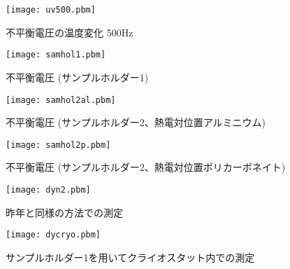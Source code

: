 \begin{figure}[htb]
	\begin{center}
	\texttt{[image: uv500.pbm]}
	\end{center}
	\caption{不平衡電圧の温度変化 500Hz}
	\label{fig:U.Voltage 500Hz}
\end{figure}

\begin{figure}[htb]
	\begin{center}
	\texttt{[image: samhol1.pbm]}
	\end{center}
	\caption{不平衡電圧 (サンプルホルダー1)}
	\label{fig:samhol1}
\end{figure}

\begin{figure}[htb]
	\begin{center}
	\texttt{[image: samhol2al.pbm]}
	\end{center}
	\caption{不平衡電圧 (サンプルホルダー2、熱電対位置アルミニウム)}
	\label{fig:samhol2al}
\end{figure}

\begin{figure}[htb]
	\begin{center}
	\texttt{[image: samhol2p.pbm]}
	\end{center}
	\caption{不平衡電圧 (サンプルホルダー2、熱電対位置ポリカーボネイト)}
	\label{fig:samhol2poli}
\end{figure}

\begin{figure}[htb]
	\begin{center}
	\texttt{[image: dyn2.pbm]}
	\end{center}
	\caption{昨年と同様の方法での測定}
	\label{fig:dyn2}
\end{figure}

\begin{figure}[htb]
	\begin{center}
	\texttt{[image: dycryo.pbm]}
	\end{center}
	\caption{サンプルホルダー1を用いてクライオスタット内での測定}
	\label{fig:dycryo}
\end{figure}
